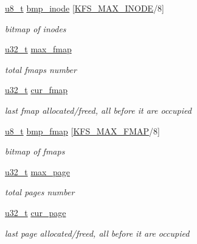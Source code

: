 \begin{DoxyCompactItemize}
\hyperlink{kfs_8c_ae081489b4906f65a3cb18e9fbe9f8d23}{u8\-\_\-t} \hyperlink{structkfs__sblock__s_a4320a5d34fc85b90d0422ae8ff024d7f}{bmp\-\_\-inode} \mbox{[}\hyperlink{kfs_8c_ac084ea319e447d4af876044655fc46ec}{K\-F\-S\-\_\-\-M\-A\-X\-\_\-\-I\-N\-O\-D\-E}/8\mbox{]}
\begin{DoxyCompactList}\small\item\em bitmap of inodes \end{DoxyCompactList}\item 
\hyperlink{kfs_8c_a0c0a490ab7fa397be6c764a935cc5ea4}{u32\-\_\-t} \hyperlink{structkfs__sblock__s_a5254da868c0d1d63a4aba34d19ff9b04}{max\-\_\-fmap}
\begin{DoxyCompactList}\small\item\em total fmaps number \end{DoxyCompactList}\item 
\hyperlink{kfs_8c_a0c0a490ab7fa397be6c764a935cc5ea4}{u32\-\_\-t} \hyperlink{structkfs__sblock__s_acb1111b4f37733c412fb8eb4788c3c83}{cur\-\_\-fmap}
\begin{DoxyCompactList}\small\item\em last fmap allocated/freed, all before it are occupied \end{DoxyCompactList}\item 
\hyperlink{kfs_8c_ae081489b4906f65a3cb18e9fbe9f8d23}{u8\-\_\-t} \hyperlink{structkfs__sblock__s_a2f9dba6f80a4fc818bbe8ca84c2d1309}{bmp\-\_\-fmap} \mbox{[}\hyperlink{kfs_8c_a75563572783e6a8183fe1fa127b6453d}{K\-F\-S\-\_\-\-M\-A\-X\-\_\-\-F\-M\-A\-P}/8\mbox{]}
\begin{DoxyCompactList}\small\item\em bitmap of fmaps \end{DoxyCompactList}\item 
\hyperlink{kfs_8c_a0c0a490ab7fa397be6c764a935cc5ea4}{u32\-\_\-t} \hyperlink{structkfs__sblock__s_a097af9f6c4329c629453634d52d2a8b0}{max\-\_\-page}
\begin{DoxyCompactList}\small\item\em total pages number \end{DoxyCompactList}\item 
\hyperlink{kfs_8c_a0c0a490ab7fa397be6c764a935cc5ea4}{u32\-\_\-t} \hyperlink{structkfs__sblock__s_aa52c224196e86427970e3c4a0830190f}{cur\-\_\-page}
\begin{DoxyCompactList}\small\item\em last page allocated/freed, all before it are occupied \end{DoxyCompactList}\item 

\end{DoxyCompactItemize}
